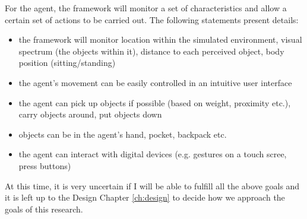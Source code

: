 For the agent, the framework will monitor a set of characteristics and allow a certain set of actions to be carried out. The following statements present details:
\begin{itemize}
	\item the framework will monitor location within the simulated environment, visual spectrum (the objects within it), distance to each perceived object, body position (sitting/standing)
	\item the agent's movement can be easily controlled in an intuitive user interface
	\item the agent can pick up objects if possible (based on weight, proximity etc.), carry objects around, put objects down
	\item objects can be in the agent's hand, pocket, backpack etc.
	\item the agent can interact with digital devices (e.g. gestures on a touch scree, press buttons)
\end{itemize}

At this time, it is very uncertain if I will be able to fulfill all the above goals and it is left up to the Design Chapter \ref{ch:design} to decide how we approach the goals of this research.
